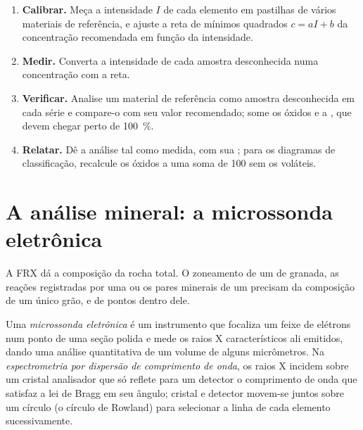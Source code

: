\begin{method}\label{met:b2:field-lab-methods-2:calibration}
\begin{enumerate}
  \item \textbf{Calibrar.} Meça a intensidade $I$ de cada elemento em pastilhas de vários materiais
        de referência, e ajuste a reta de mínimos quadrados $c = aI + b$ da concentração recomendada
        em função da intensidade.
  \item \textbf{Medir.} Converta a intensidade de cada amostra desconhecida numa concentração com a reta.
  \item \textbf{Verificar.} Analise um material de referência como amostra desconhecida em cada série e compare-o com
        seu valor recomendado; some os óxidos e a , que devem chegar perto
        de \qty{100}{\percent}.
  \item \textbf{Relatar.} Dê a análise tal como medida, com sua ; para os
        diagramas de classificação, recalcule os óxidos a uma soma de 100 sem os voláteis.
\end{enumerate}
\end{method}

\section{A análise mineral: a microssonda eletrônica}\label{sec:b2:field-lab-methods-2:microprobe}

A FRX dá a composição da rocha total. O zoneamento de um  de granada, as reações
registradas por uma  ou os pares minerais de um  precisam da composição de um único
grão, e de pontos dentro dele.

\begin{definition}\label{def:b2:field-lab-methods-2:epma}
Uma \emph{microssonda eletrônica} é um instrumento que focaliza um feixe de
elétrons num ponto de uma seção polida e mede os raios X característicos ali emitidos,
dando uma análise quantitativa de um volume de alguns micrômetros. Na
\emph{espectrometria por dispersão de comprimento de onda}, os raios X incidem
sobre um cristal analisador que só reflete para um detector o comprimento de onda que satisfaz a lei de Bragg em
seu ângulo; cristal e detector movem-se juntos sobre um círculo (o círculo de Rowland) para selecionar a linha de cada
elemento sucessivamente.
\end{definition}

